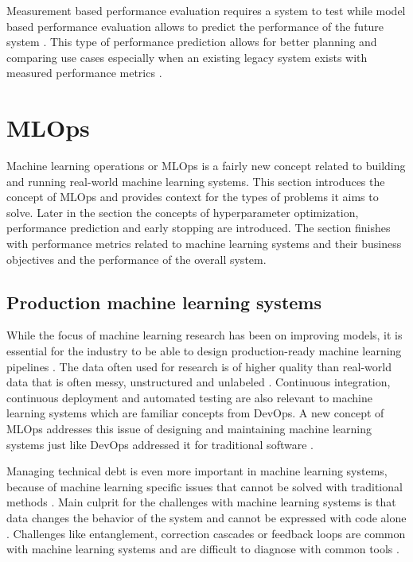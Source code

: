 Measurement based performance evaluation requires a system to test while model based performance evaluation allows to predict the performance of the future system \parencite{brunnertPerformanceorientedDevOpsResearch2015}. This type of performance prediction allows for better planning and comparing use cases especially when an existing legacy system exists with measured performance metrics \parencite{brunnertPerformanceorientedDevOpsResearch2015}.

\section{MLOps} %
\label{sec:mldevops}

Machine learning operations or MLOps is a fairly new concept related to building and running real-world machine learning systems. This section introduces the concept of MLOps and provides context for the types of problems it aims to solve. Later in the section the concepts of hyperparameter optimization, performance prediction and early stopping are introduced. The section finishes with performance metrics related to machine learning systems and their business objectives and the performance of the overall system.

\subsection{Production machine learning systems}

While the focus of machine learning research has been on improving models, it is essential for the industry to be able to design production-ready machine learning pipelines \parencite{posoldovaMachineLearningPipelines2020}. The data often used for research is of higher quality than real-world data that is often messy, unstructured and unlabeled \parencite{posoldovaMachineLearningPipelines2020}. Continuous integration, continuous deployment and automated testing are also relevant to machine learning systems \parencite{posoldovaMachineLearningPipelines2020} which are familiar concepts from DevOps. A new concept of MLOps addresses this issue of designing and maintaining machine learning systems just like DevOps addressed it for traditional software \parencite{kreuzbergerMachineLearningOperations2023}.

Managing technical debt is even more important in machine learning systems, because of machine learning specific issues that cannot be solved with traditional methods \parencite{sculleyHiddenTechnicalDebt2015a}. Main culprit for the challenges with machine learning systems is that data changes the behavior of the system and cannot be expressed with code alone \parencite{sculleyHiddenTechnicalDebt2015a}. Challenges like entanglement, correction cascades or feedback loops are common with machine learning systems and are difficult to diagnose with common tools \parencite{sculleyHiddenTechnicalDebt2015a}.

